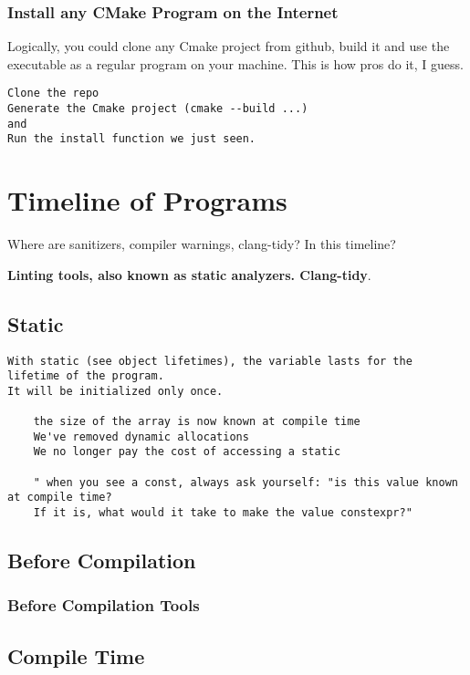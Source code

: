 \documentclass[openany]{report}
\begin{document}
\subsection{Install any CMake Program on the Internet}

Logically, you could clone any Cmake project from github, build it and use the executable as a regular
program on your machine. This is how pros do it, I guess.


\begin{verbatim}
Clone the repo
Generate the Cmake project (cmake --build ...)
and
Run the install function we just seen.
\end{verbatim}
\chapter{Timeline of Programs}

Where are sanitizers, compiler warnings, clang-tidy? In this timeline?


\textbf{Linting tools, also known as static analyzers. Clang-tidy}.


\section{Static}

\begin{verbatim}
With static (see object lifetimes), the variable lasts for the lifetime of the program.
It will be initialized only once. 

    the size of the array is now known at compile time
    We've removed dynamic allocations
    We no longer pay the cost of accessing a static

    " when you see a const, always ask yourself: "is this value known at compile time? 
    If it is, what would it take to make the value constexpr?" 
\end{verbatim}

\section{Before Compilation}

\subsection{Before Compilation Tools}


\section{Compile Time}
\end{document}
